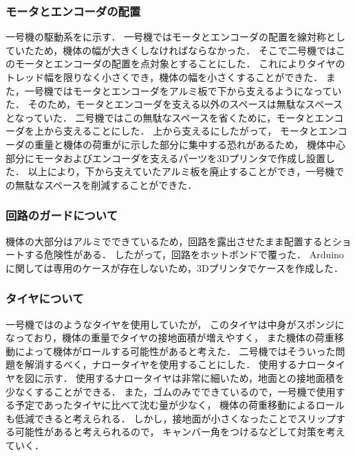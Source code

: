 \documentclass[11pt,a4]{jsarticle}
\begin{document}

    \subsubsection{モータとエンコーダの配置}
      一号機の駆動系をに示す．
      一号機ではモータとエンコーダの配置を線対称としていたため，機体の幅が大きくしなければならなかった．
      そこで二号機ではこのモータとエンコーダの配置を点対象とすることにした．
      これによりタイヤのトレッド幅を限りなく小さくでき，機体の幅を小さくすることができた．
      また，一号機ではモータとエンコーダをアルミ板で下から支えるようになっていた．
      そのため，モータとエンコーダを支える以外のスペースは無駄なスペースとなっていた．
      二号機ではこの無駄なスペースを省くために，モータとエンコーダを上から支えることにした．
      上から支えるにしたがって，
      モータとエンコーダの重量と機体の荷重がに示した部分に集中する恐れがあるため，
      機体中心部分にモータおよびエンコーダを支えるパーツを3Dプリンタで作成し設置した．
      以上により，下から支えていたアルミ板を廃止することができ，一号機での無駄なスペースを削減することができた．

    \subsubsection{回路のガードについて}
      機体の大部分はアルミでできているため，回路を露出させたまま配置するとショートする危険性がある．
      したがって，回路をホットボンドで覆った．
      Arduinoに関しては専用のケースが存在しないため，3Dプリンタでケースを作成した．

    \subsubsection{タイヤについて}
      一号機ではのようなタイヤを使用していたが，
      このタイヤは中身がスポンジになっており，機体の重量でタイヤの接地面積が増えやすく，
      また機体の荷重移動によって機体がロールする可能性があると考えた．
      二号機ではそういった問題を解消するべく，ナロータイヤを使用することにした．
      使用するナロータイヤを図に示す．
      使用するナロータイヤは非常に細いため，地面との接地面積を少なくすることができる．
      また，ゴムのみでできているので，一号機で使用する予定であったタイヤに比べて沈む量が少なく，
      機体の荷重移動によるロールも低減できると考えられる．
      しかし，接地面が小さくなったことでスリップする可能性があると考えられるので，
      キャンバー角をつけるなどして対策を考えていく．
\end{document}
